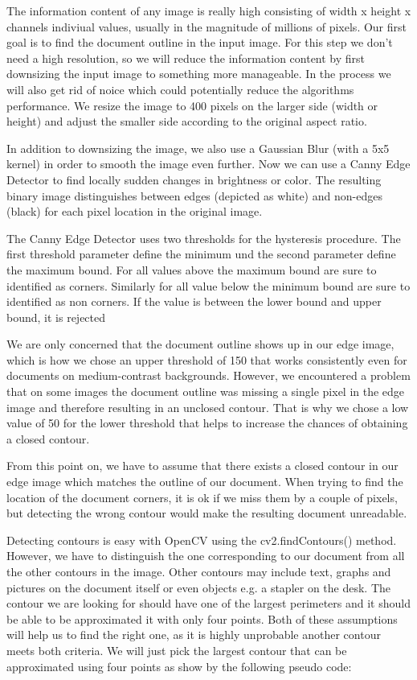 \documentclass[bibliography=totoc]{scrartcl}
\begin{document}
	The information content of any image is really high consisting of width x height x channels indiviual values, usually in the magnitude of millions of pixels.
	Our first goal is to find the document outline in the input image.
	For this step we don't need a high resolution, so we will reduce the information content by first downsizing the input image to something more manageable.
	In the process we will also get rid of noice which could potentially reduce the algorithms performance.
	We resize the image to 400 pixels on the larger side (width or height) and adjust the smaller side according to the original aspect ratio.
	
	In addition to downsizing the image, we also use a Gaussian Blur (with a 5x5 kernel) in order to smooth the image even further.
	Now we can use a Canny Edge Detector to find locally sudden changes in brightness or color. 
	The resulting binary image distinguishes between edges (depicted as white) and non-edges (black) for each pixel location in the original image.
	
	The Canny Edge Detector uses two thresholds for the hysteresis procedure. 
	The first threshold parameter define the minimum und the second parameter define the maximum bound.
	For all values above the maximum bound are sure to identified as corners. 
	Similarly for all value below the minimum bound are sure to identified as non corners. 
	If the value is between the lower bound and upper bound, it is rejected
	
	We are only concerned that the document outline shows up in our edge image, which is how we chose an upper threshold of 150 that works consistently even for documents on medium-contrast backgrounds. 
	However, we encountered a problem that on some images the document outline was missing a single pixel in the edge image and therefore resulting in an unclosed contour.
	That is why we chose a low value of 50 for the lower threshold that helps to increase the chances of obtaining a closed contour.
	
	From this point on, we have to assume that there exists a closed contour in our edge image which matches the outline of our document. 
	When trying to find the location of the document corners, it is ok if we miss them by a couple of pixels, but detecting the wrong contour would make the resulting document unreadable.

	Detecting contours is easy with OpenCV using the cv2.findContours() method.
	However, we have to distinguish the one corresponding to our document from all the other contours in the image.
	Other contours may include text, graphs and pictures on the document itself or even objects e.g. a stapler on the desk. 
	The contour we are looking for should have one of the largest perimeters and it should be able to be approximated it with only four points.
	Both of these assumptions will help us to find the right one, as it is highly unprobable another contour meets both criteria. 
	We will just pick the largest contour that can be approximated using four points as show by the following pseudo code:
	
\end{document}
